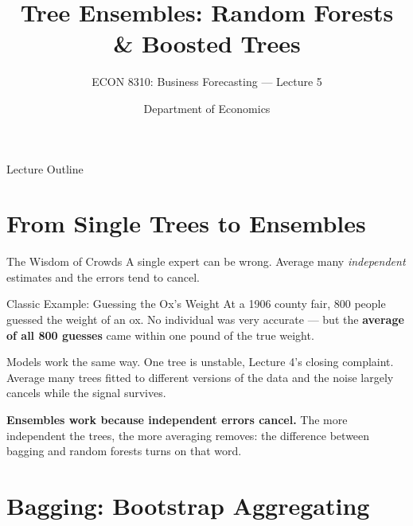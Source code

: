 \documentclass[aspectratio=169, 11pt]{beamer}
\title[Tree Ensembles]{Tree Ensembles: Random Forests \& Boosted Trees}
\subtitle{ECON 8310: Business Forecasting --- Lecture 5}
\author{Department of Economics}
\institute{University of Nebraska at Omaha}
\begin{document}

\begin{frame}
  \titlepage
\end{frame}

\begin{frame}{Lecture Outline}
  \tableofcontents
\end{frame}

\section{From Single Trees to Ensembles}


\begin{frame}{The Wisdom of Crowds}
  A single expert can be wrong. Average many \emph{independent} estimates and the errors tend
  to cancel.
  \begin{examplebox}{Classic Example: Guessing the Ox's Weight}
    At a 1906 county fair, 800 people guessed the weight of an ox. No individual was very
    accurate --- but the \textbf{average of all 800 guesses} came within one pound of the
    true weight.
  \end{examplebox}

  \vspace{0.15cm}
  Models work the same way. One tree is unstable, Lecture 4's closing complaint. Average many
  trees fitted to different versions of the data and the noise largely cancels while the signal
  survives.

  \vspace{0.15cm}
  \textbf{Ensembles work because independent errors cancel.} The more independent the trees, the
  more averaging removes: the difference between bagging and random forests turns on that word.
\end{frame}

\section{Bagging: Bootstrap Aggregating}
\end{document}

